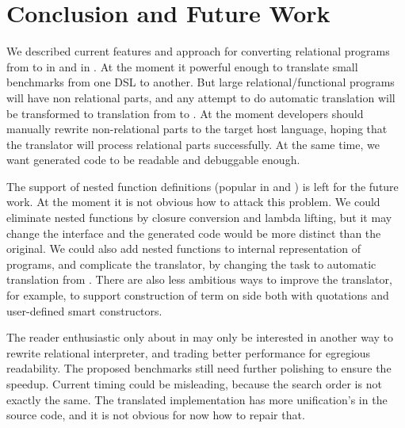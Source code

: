 
\section{Conclusion and Future Work}

We described current features and approach for converting relational programs from \OCanren{} to \Klogic{} in \Kotlin{} and \miniKanren{} in \Scheme{}.
At the moment it powerful enough to translate small benchmarks from one DSL to another.
But large relational/functional programs will have  non relational parts, and any attempt to do automatic translation will be transformed to translation from \OCaml{} to \Scheme{}.
At the moment developers should manually rewrite non-relational parts to the target host language, hoping that the translator will process relational parts successfully.
At the same time, we want generated code to be readable and debuggable enough.

The support of nested function definitions (popular in \OCaml{} and \OCanren{}) is left for the future work.
At the moment it is not obvious how to attack this problem.
We could eliminate nested functions by closure conversion and lambda lifting, but it may change the interface and the generated code would be more distinct than the original.
We could also add nested functions to internal representation of \OCanren{} programs, and complicate the translator, by changing the task to automatic translation from \OCaml{}. There are also less ambitious ways to improve the translator, for example, to support construction of term on \Scheme{} side both with quotations and user-defined smart constructors.

The reader enthusiastic only about \miniKanren{} in \Scheme{} may only be interested in another way to rewrite relational interpreter, and trading better performance for egregious readability.
The proposed benchmarks still need further polishing to ensure the speedup.
Current timing could be misleading, because the search order is not exactly the same.
The translated implementation has more unification's in the source code, and it is not obvious for now how to repair that.
